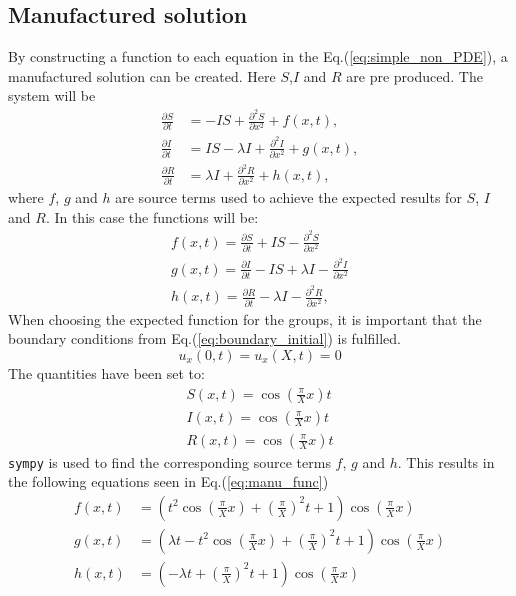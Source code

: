 \documentclass[%
twoside,                 %
final,                   %
chapterprefix=true,      %
open=right               %
10pt]{book}
\begin{document}
\subsection{Manufactured solution}
By constructing a function to each equation in the Eq.(\ref{eq:simple_non_PDE}), a manufactured solution can be created. Here $S$,$I$ and $R$ are pre produced. The system will be
\begin{equation} \label{eq:simple_non_PDE3}
	\begin{aligned}
	\frac{\partial S}{\partial t} &= -IS + \frac{\partial^2 S}{\partial x^2}+f(x,t),\\
	\frac{\partial I}{\partial t} &= IS- \lambda I + \frac{\partial^2 I}{\partial x^2}+g(x,t),\\
	\frac{\partial R}{\partial t} &= \lambda I + \frac{\partial^2 R}{\partial x^2}+h(x,t),
	\end{aligned}
\end{equation}
where $f$, $g$ and $h$ are source terms used to achieve the expected results for $S$, $I$ and $R$. In this case the functions will be:
\begin{equation}
	\begin{aligned}
	f(x,t) = \frac{\partial S}{\partial t} + IS - \frac{\partial^2 S}{\partial x^2}\\
	g(x,t) = \frac{\partial I}{\partial t} - IS + \lambda I - \frac{\partial^2 I}{\partial x^2}\\
	h(x,t) = \frac{\partial R}{\partial t} -\lambda I - \frac{\partial^2 R}{\partial x^2},
	\end{aligned}
\end{equation}
When choosing the expected function for the groups, it is important that the boundary conditions from Eq.(\ref{eq:boundary_initial}) is fulfilled.
\begin{equation}
    u_x(0,t) = u_x(X,t) = 0
\end{equation}
The quantities have been set to:
\begin{equation}
	\begin{aligned}
    S(x,t) = \cos(\frac{\pi}{X}x)t\\
    I(x,t) = \cos(\frac{\pi}{X}x)t\\
    R(x,t) = \cos(\frac{\pi}{X}x)t
	\end{aligned}
\end{equation}
\Verb!sympy! is used to find the corresponding source terms $f$, $g$ and $h$. This results in the following equations seen in Eq.(\ref{eq:manu_func}) 
\begin{equation} \label{eq:manu_func}
	\begin{aligned}
	f(x,t) &= (t^2\cos(\frac{\pi}{X} x) + (\frac{\pi}{X})^2t + 1)\cos(\frac{\pi}{X} x)\\
	g(x,t) &= (\lambda t - t^2\cos(\frac{\pi}{X} x) + (\frac{\pi}{X})^2t + 1)\cos(\frac{\pi}{X} x)\\
	h(x,t) &= (-\lambda t + (\frac{\pi}{X})^2t + 1)\cos(\frac{\pi}{X} x)
	\end{aligned}
\end{equation}
\end{document}
